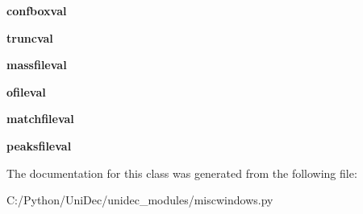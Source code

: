 \begin{DoxyCompactItemize}
\item 
\hypertarget{class_uni_dec_1_1unidec__modules_1_1miscwindows_1_1_file_name_dialog_a5f26f52745a977a7793804051e294da3}{}{\bfseries confboxval}\label{class_uni_dec_1_1unidec__modules_1_1miscwindows_1_1_file_name_dialog_a5f26f52745a977a7793804051e294da3}

\item 
\hypertarget{class_uni_dec_1_1unidec__modules_1_1miscwindows_1_1_file_name_dialog_a1f12b8398ea4c854e2a9e61f5ae2a1ab}{}{\bfseries truncval}\label{class_uni_dec_1_1unidec__modules_1_1miscwindows_1_1_file_name_dialog_a1f12b8398ea4c854e2a9e61f5ae2a1ab}

\item 
\hypertarget{class_uni_dec_1_1unidec__modules_1_1miscwindows_1_1_file_name_dialog_a84fdc38a7a495b72ba6a76a6f21fb258}{}{\bfseries massfileval}\label{class_uni_dec_1_1unidec__modules_1_1miscwindows_1_1_file_name_dialog_a84fdc38a7a495b72ba6a76a6f21fb258}

\item 
\hypertarget{class_uni_dec_1_1unidec__modules_1_1miscwindows_1_1_file_name_dialog_abaebf237fb2ac41823bc9cdb2d8b4298}{}{\bfseries ofileval}\label{class_uni_dec_1_1unidec__modules_1_1miscwindows_1_1_file_name_dialog_abaebf237fb2ac41823bc9cdb2d8b4298}

\item 
\hypertarget{class_uni_dec_1_1unidec__modules_1_1miscwindows_1_1_file_name_dialog_a55bfef82017cf83885e744739559e904}{}{\bfseries matchfileval}\label{class_uni_dec_1_1unidec__modules_1_1miscwindows_1_1_file_name_dialog_a55bfef82017cf83885e744739559e904}

\item 
\hypertarget{class_uni_dec_1_1unidec__modules_1_1miscwindows_1_1_file_name_dialog_ad0bf7ec16c468ae7c5f147743c92d42d}{}{\bfseries peaksfileval}\label{class_uni_dec_1_1unidec__modules_1_1miscwindows_1_1_file_name_dialog_ad0bf7ec16c468ae7c5f147743c92d42d}

\end{DoxyCompactItemize}


The documentation for this class was generated from the following file\+:\begin{DoxyCompactItemize}
\item 
C\+:/\+Python/\+Uni\+Dec/unidec\+\_\+modules/miscwindows.\+py\end{DoxyCompactItemize}

